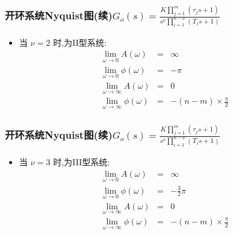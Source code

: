 \documentclass[table]{beamer}
\begin{document}
\begin{frame}
\frametitle{开环系统Nyquist图(续)$G_o(s) =\frac{K\prod_{j=1}^m(\tau_j s+1)}{s^{\nu}\prod_{i=1}^{n-\nu}(T_i s+1)}$}
\label{sec-1-3}

\begin{itemize}
\item 当  $\nu=2$  时,为II型系统:
     \begin{eqnarray*}
     \lim_{\omega\rightarrow 0} A(\omega) & = & \infty\\
     \lim_{\omega\rightarrow 0} \phi(\omega)&=&-\pi \\
     \lim_{\omega\rightarrow\infty} A(\omega)&=&0 \\
     \lim_{\omega\rightarrow\infty} \phi(\omega)&=& -(n-m)\times\frac{\pi}{2} 
     \end{eqnarray*}
\end{itemize}
\end{frame}
\begin{frame}
\frametitle{开环系统Nyquist图(续)$G_o(s) =\frac{K\prod_{j=1}^m(\tau_j s+1)}{s^{\nu}\prod_{i=1}^{n-\nu}(T_i s+1)}$}
\label{sec-1-4}

\begin{itemize}
\item 当  $\nu=3$  时,为III型系统:
     \begin{eqnarray*}
     \lim_{\omega\rightarrow 0} A(\omega) & = & \infty\\
     \lim_{\omega\rightarrow 0} \phi(\omega)&=&-\frac{3}{2}\pi \\
     \lim_{\omega\rightarrow\infty} A(\omega)&=&0 \\
     \lim_{\omega\rightarrow\infty} \phi(\omega)&=& -(n-m)\times\frac{\pi}{2} 
     \end{eqnarray*}
\end{itemize}
\end{frame}
\end{document}
